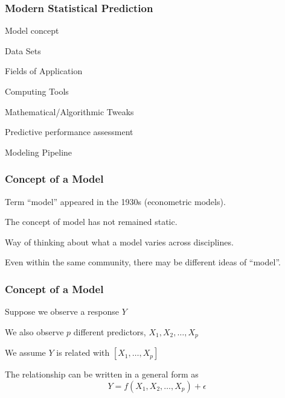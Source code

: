 \documentclass[12pt]{beamer}\usepackage[]{graphicx}\usepackage[]{color}
\begin{document}
\begin{frame}
\frametitle{Modern Statistical Prediction}

\bbi
  \item Model concept
  \item Data Sets
  \item Fields of Application
  \item Computing Tools
  \item Mathematical/Algorithmic Tweaks
  \item Predictive performance assessment 
  \item Modeling Pipeline
\ei
\eb

\end{frame}


\begin{frame}
\frametitle{Concept of a Model}

\bbi
  \item Term ``model'' appeared in the 1930s (econometric models).
  \item The concept of model has not remained static.
  \item Way of thinking about what a model varies across disciplines.
  \item Even within the same community, there may be different ideas of ``model''.
\ei

\end{frame}


\begin{frame}
\frametitle{Concept of a Model}

\bbi
  \item Suppose we observe a response $Y$ 
  \item We also observe $p$ different predictors, $X_1, X_2, \dots, X_p$
  \item We assume $Y$ is related with $[X_1, \dots, X_p]$
  \item The relationship can be written in a general form as \\
  $$
  Y = f(X_1, X_2, \dots, X_p) + \epsilon
  $$
\ei

\end{frame}

\end{document}
